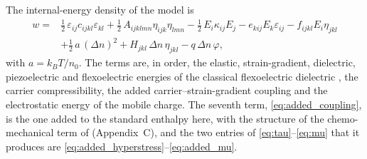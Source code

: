 The internal-energy density of the model is
\begin{equation}
\label{eq:enthalpy}
\begin{aligned}
w={}&\tfrac12\,\varepsilon_{ij}c_{ijkl}\varepsilon_{kl}
+\tfrac12\,A_{ijklmn}\eta_{ijk}\eta_{lmn}
-\tfrac12\,E_i\kappa_{ij}E_j
-e_{kij}E_k\varepsilon_{ij}
-f_{ijkl}E_i\eta_{jkl}\\
&+\tfrac12\,a\,(\Delta n)^2
+H_{jkl}\,\Delta n\,\eta_{jkl}
-q\,\Delta n\,\varphi ,
\end{aligned}
\end{equation}
with $a=k_BT/n_0$.  The terms are, in order, the elastic, strain-gradient,
dielectric, piezoelectric and flexoelectric energies of the classical
flexoelectric dielectric \cite{shen2010theory}, the carrier compressibility, the
added carrier--strain-gradient coupling and the electrostatic energy of the
mobile charge.  The seventh term, \eqref{eq:added_coupling}, is the one added to the standard enthalpy here, with the structure of the chemo-mechanical term of \cite{qu2025thermodynamic} (Appendix~C),
and the two entries of \eqref{eq:tau}--\eqref{eq:mu} that it produces are
\eqref{eq:added_hyperstress}--\eqref{eq:added_mu}.

